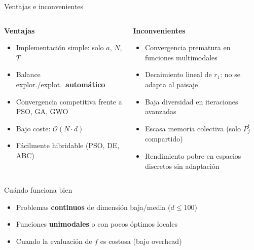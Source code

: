 \documentclass[aspectratio=169]{beamer}
\newcommand{\warn}[1]{\textcolor{myred}{\textbf{#1}}}
\newcommand{\good}[1]{\textcolor{mygreen}{\textbf{#1}}}
\begin{document}
\begin{frame}{Ventajas e inconvenientes}
  \small
  \begin{columns}[T]
      \begin{exampleblock}{\good{Ventajas}}
        \begin{itemize}
          \item Implementación simple: solo $a$, $N$, $T$
          \item Balance explor./explot.\ \textbf{automático}
          \item Convergencia competitiva frente a PSO, GA, GWO
          \item Bajo coste: $\mathcal{O}(N \cdot d)$
          \item Fácilmente hibridable (PSO, DE, ABC)
        \end{itemize}
      \end{exampleblock}

      \begin{alertblock}{\warn{Inconvenientes}}
        \begin{itemize}
          \item Convergencia prematura en funciones multimodales
          \item Decaimiento lineal de $r_1$: no se adapta al paisaje
          \item Baja diversidad en iteraciones avanzadas
          \item Escasa memoria colectiva (solo $P_j^t$ compartido)
          \item Rendimiento pobre en espacios discretos sin adaptación
        \end{itemize}
      \end{alertblock}
  \end{columns}

  \vspace{0.5em}
  \begin{block}{Cuándo funciona bien}
    \begin{itemize}
      \item Problemas \textbf{continuos} de dimensión baja/media ($d \leq 100$)
      \item Funciones \textbf{unimodales} o con pocos óptimos locales
      \item Cuando la evaluación de $f$ es costosa (bajo overhead)
    \end{itemize}
  \end{block}
\end{frame}
\end{document}
